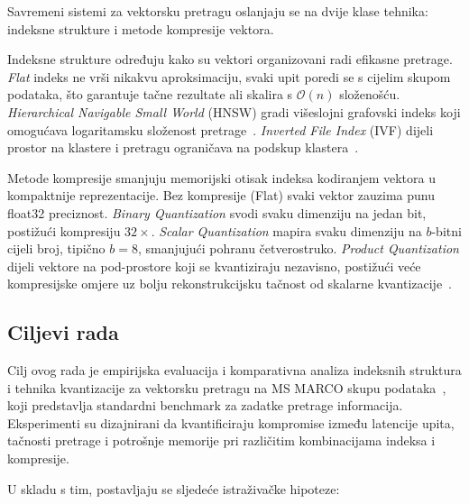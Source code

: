 Savremeni sistemi za vektorsku pretragu oslanjaju se na dvije klase
tehnika: indeksne strukture i metode kompresije vektora.

Indeksne strukture određuju kako su vektori organizovani radi efikasne
pretrage. \foreignlanguage{english}{\emph{Flat}} indeks ne vrši nikakvu
aproksimaciju, svaki upit poredi se s cijelim skupom podataka, što
garantuje tačne rezultate ali skalira s $\mathcal{O}(n)$ složenošću.
\foreignlanguage{english}{\emph{Hierarchical Navigable Small World}}
(HNSW) gradi višeslojni grafovski indeks koji omogućava logaritamsku
složenost pretrage~\cite{malkov2018efficient}.
\foreignlanguage{english}{\emph{Inverted File Index}} (IVF) dijeli
prostor na klastere i pretragu ograničava na podskup
klastera~\cite{jegou2011product}.

Metode kompresije smanjuju memorijski otisak indeksa kodiranjem vektora
u kompaktnije reprezentacije. Bez kompresije (\foreignlanguage{english}{Flat})
svaki vektor zauzima punu \foreignlanguage{english}{float32} preciznost.
\foreignlanguage{english}{\emph{Binary Quantization}} svodi svaku
dimenziju na jedan bit, postižući kompresiju $32\times$.
\foreignlanguage{english}{\emph{Scalar Quantization}} mapira svaku
dimenziju na $b$-bitni cijeli broj, tipično $b=8$, smanjujući pohranu
četverostruko.
\foreignlanguage{english}{\emph{Product Quantization}} dijeli vektore na
pod-prostore koji se kvantiziraju nezavisno, postižući veće kompresijske
omjere uz bolju rekonstrukcijsku tačnost od skalarne
kvantizacije~\cite{raja2026memory}.

\subsection{Ciljevi rada}
\label{sec:ciljevi}

Cilj ovog rada je empirijska evaluacija i komparativna analiza
indeksnih struktura i tehnika kvantizacije za vektorsku pretragu na
\foreignlanguage{english}{MS MARCO} skupu podataka~\cite{msmarco2016},
koji predstavlja standardni benchmark za zadatke pretrage informacija.
Eksperimenti su dizajnirani da kvantificiraju kompromise između
latencije upita, tačnosti pretrage i potrošnje memorije pri različitim
kombinacijama indeksa i kompresije.

\noindent U skladu s tim, postavljaju se sljedeće istraživačke hipoteze:

